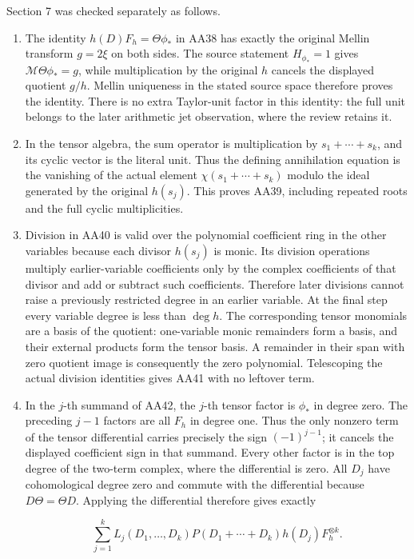 Section 7 was checked separately as follows.

\begin{enumerate}
\def\labelenumi{\arabic{enumi}.}
\item
  The identity \(h(D)F_h=\Theta\phi_*\) in AA38 has exactly the original Mellin transform \(g=2\xi\) on both sides. The source statement \(H_{\phi_*}=1\) gives \(\mathcal M\Theta\phi_*=g\), while multiplication by the original \(h\) cancels the displayed quotient \(g/h\). Mellin uniqueness in the stated source space therefore proves the identity. There is no extra Taylor-unit factor in this identity: the full unit belongs to the later arithmetic jet observation, where the review retains it.
\item
  In the tensor algebra, the sum operator is multiplication by \(s_1+\cdots+s_k\), and its cyclic vector is the literal unit. Thus the defining annihilation equation is the vanishing of the actual element \(\chi(s_1+\cdots+s_k)\) modulo the ideal generated by the original \(h(s_j)\). This proves AA39, including repeated roots and the full cyclic multiplicities.
\item
  Division in AA40 is valid over the polynomial coefficient ring in the other variables because each divisor \(h(s_j)\) is monic. Its division operations multiply earlier-variable coefficients only by the complex coefficients of that divisor and add or subtract such coefficients. Therefore later divisions cannot raise a previously restricted degree in an earlier variable. At the final step every variable degree is less than \(\deg h\). The corresponding tensor monomials are a basis of the quotient: one-variable monic remainders form a basis, and their external products form the tensor basis. A remainder in their span with zero quotient image is consequently the zero polynomial. Telescoping the actual division identities gives AA41 with no leftover term.
\item
  In the \(j\)-th summand of AA42, the \(j\)-th tensor factor is \(\phi_*\) in degree zero. The preceding \(j-1\) factors are all \(F_h\) in degree one. Thus the only nonzero term of the tensor differential carries precisely the sign \((-1)^{j-1}\); it cancels the displayed coefficient sign in that summand. Every other factor is in the top degree of the two-term complex, where the differential is zero. All \(D_j\) have cohomological degree zero and commute with the differential because \(D\Theta=\Theta D\). Applying the differential therefore gives exactly

  \[
\sum_{j=1}^k L_j(D_1,\ldots,D_k)
P(D_1+\cdots+D_k)h(D_j)F_h^{\otimes k}.
\]


\end{enumerate}
